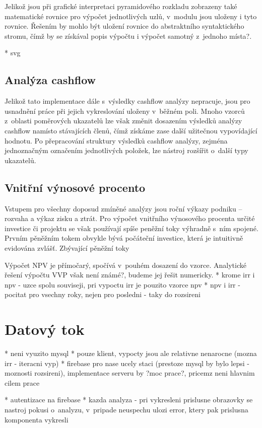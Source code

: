Jelikož jsou při grafické interpretaci pyramidového rozkladu zobrazeny také matematické rovnice pro výpočet jednotlivých uzlů, v~modulu jsou uloženy i tyto rovnice. Řešením by mohlo být uložení rovnice do abstraktního syntaktického stromu, čímž by se získával popis výpočtu i výpočet samotný z~jednoho místa?.

* svg

\subsection{Analýza cashflow}
Jelikož tato implementace dále s~výsledky cashflow analýzy nepracuje, jsou pro usnadnění práce při jejich vykreslování uloženy v~běžném poli. Mnoho vzorců z~oblasti poměrových ukazatelů lze však změnit dosazením výsledků analýzy cashflow namísto stávajících členů, čímž získáme zase další užitečnou vypovídající hodnotu. Po přepracování struktury výsledků cashflow analýzy, zejména jednoznačným označením jednotlivých položek, lze nástroj rozšířit o~další typy ukazatelů. 

\subsection{Vnitřní výnosové procento}
\label{irr}
Vstupem pro všechny doposud zmíněné analýzy jsou roční výkazy podniku -- rozvaha a výkaz zisku a ztrát. Pro výpočet vnitřního výnosového procenta určité investice či projektu se však používají spíše peněžní toky výhradně s~ním spojené. Prvním pěněžním tokem obvykle bývá počáteční investice, která je intuitivně evidována zvlášť. Zbývající pěněžní toky 

Výpočet NPV je přímočarý, spočívá v~pouhém dosazení do vzorce. Analytické řešení výpočtu VVP však není známé?, budeme jej řešit numericky. 
* krome irr i npv - uzce spolu souviseji, pri vypoctu irr je pouzito vzorce npv
* npv i irr - pocitat pro vsechny roky, nejen pro posledni - taky do rozsireni

\section{Datový tok}

* neni vyuzito mysql
* pouze klient, vypocty jsou ale relativne nenarocne (mozna irr - iteracni vyp)
* firebase pro nase ucely staci (prestoze mysql by bylo lepsi - moznosti rozsireni), implementace serveru by ?moc prace?, pricemz neni hlavnim cilem prace


* autentizace na firebase
* kazda analyza - pri vykresleni prislusne obrazovky se nastroj pokusi o~analyzu, v~pripade neuspechu ulozi error, ktery pak prislusna komponenta vykresli


